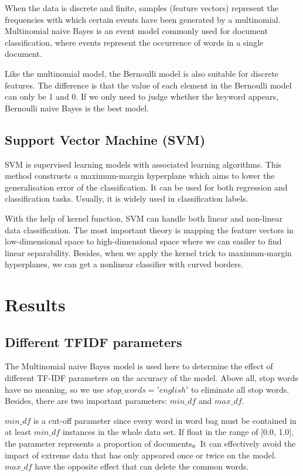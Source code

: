 \documentclass[11pt]{article}
\begin{document}
When the data is discrete and finite, samples (feature vectors) represent the frequencies with which certain events have been generated by a multinomial. Multinomial naive Bayes is an event model commonly used for document classification, where events represent the occurrence of words in a single document.

Like the multinomial model, the Bernoulli model is also suitable for discrete features. The difference is that the value of each element in the Bernoulli model can only be 1 and 0. If we only need to judge whether the keyword appears, Bernoulli naive Bayes is the best model.

\subsection{Support Vector Machine (SVM)}
SVM is supervised learning models with associated learning algorithms. This method constructs a maximum-margin hyperplane which aims to lower the generalisation error of the classification. It can be used for both regression and classification tasks. Usually, it is widely used in classification labels.

With the help of kernel function, SVM can handle both linear and non-linear data classification. The most important theory is mapping the feature vectors in low-dimensional space to high-dimensional space where we can easiler to find linear separability. Besides, when we apply the kernel trick to maximum-margin hyperplanes, we can get a nonlinear classifier with curved borders.

\section{Results}

\subsection{Different TFIDF parameters}

The Multinomial naive Bayes model is used here to determine the effect of different TF-IDF parameters on the accuracy of the model.
Above all, stop words have no meaning, so we use $stop\_words='english'$ to eliminate all stop words. Besides, there are two important parameters: $min\_df$ and $max\_df$.

$min\_df$ is a cut-off parameter since every word in word bag must be contained in at least $min\_df$ instances in the whole data set. If float in the range of [0.0, 1.0], the parameter represents a proportion of documents。It can effectively avoid the impact of extreme data that has only appeared once or twice on the model. $max\_df$ have the opposite effect that can delete the common words.
\end{document}
